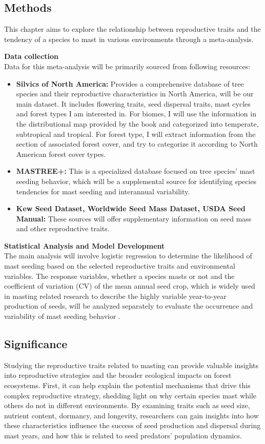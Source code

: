 \documentclass[11pt,letter]{article}
\begin{document}
\subsection{Methods}
This chapter aims to explore the relationship between reproductive traits and the tendency of a species to mast in various environments through a meta-analysis.\par
\textbf{Data collection}\\
Data for this meta-analysis will be primarily sourced from following resources:
	\begin{itemize}
	\item \textbf{Silvics of North America:} Provides a comprehensive database of tree species and their reproductive characteristics in North America, will be our main dataset. It includes flowering traits, seed dispersal traits, mast cycles and forest types I am interested in. For biomes, I will use the information in the distributional map provided by the book and categorized into temperate, subtropical and tropical. For forest type, I will extract information from the section of associated forest cover, and try to categorize it according to North American forest cover types.
	\item \textbf{MASTREE+:} This is a specialized database focused on tree species' mast seeding behavior, which will be a supplemental source for identifying species tendencies for mast seeding and interannual variability.
	\item \textbf{Kew Seed Dataset, Worldwide Seed Mass Dataset, USDA Seed Manual:} These sources will offer supplementary information on seed mass and other reproductive traits.
	\end{itemize}
\textbf{Statistical Analysis and Model Development}\\
The main analysis will involve logistic regression to determine the likelihood of mast seeding based on the selected reproductive traits and environmental variables. The response variables, whether a species masts or not and the coefficient of variation (CV) of the mean annual seed crop,  which is widely used in masting related research to describe the highly variable year-to-year production of seeds, will be analyzed separately to evaluate the occurrence and variability of mast seeding behavior \citep{kelly2002mast}.

\subsection{Significance} 
Studying the reproductive traits related to masting can provide valuable insights into reproductive strategies and the broader ecological impacts on forest ecosystems. First, it can help explain the potential mechanisms that drive this complex reproductive strategy, shedding light on why certain species mast while others do not in different environments. By examining traits such as seed size, nutrient content, dormancy, and longevity, researchers can gain insights into how these characteristics influence the success of seed production and dispersal during mast years, and how this is related to seed predators' population dynamics.\par
\end{document}
